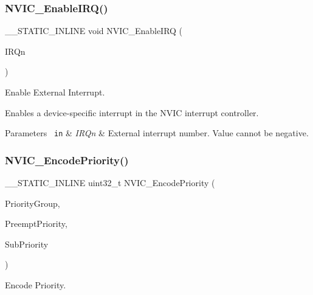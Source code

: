 \subsubsection{\texorpdfstring{NVIC\_EnableIRQ()}{NVIC\_EnableIRQ()}}
{\footnotesize\ttfamily \+\_\+\+\_\+\+S\+T\+A\+T\+I\+C\+\_\+\+I\+N\+L\+I\+NE void N\+V\+I\+C\+\_\+\+Enable\+I\+RQ (\begin{DoxyParamCaption}\item[{\mbox{\hyperlink{group__SAME70J19__cmsis_gac3af4a32370fb28c4ade8bf2add80251}{I\+R\+Qn\+\_\+\+Type}}}]{I\+R\+Qn }\end{DoxyParamCaption})}



Enable External Interrupt. 

Enables a device-\/specific interrupt in the N\+V\+IC interrupt controller. 
\begin{DoxyParams}[1]{Parameters}
\mbox{\texttt{ in}}  & {\em I\+R\+Qn} & External interrupt number. Value cannot be negative. \\
\hline
\end{DoxyParams}
\mbox{\label{group__CMSIS__Core__NVICFunctions_gadb94ac5d892b376e4f3555ae0418ebac}} 
\subsubsection{\texorpdfstring{NVIC\_EncodePriority()}{NVIC\_EncodePriority()}}
{\footnotesize\ttfamily \+\_\+\+\_\+\+S\+T\+A\+T\+I\+C\+\_\+\+I\+N\+L\+I\+NE uint32\+\_\+t N\+V\+I\+C\+\_\+\+Encode\+Priority (\begin{DoxyParamCaption}\item[{uint32\+\_\+t}]{Priority\+Group,  }\item[{uint32\+\_\+t}]{Preempt\+Priority,  }\item[{uint32\+\_\+t}]{Sub\+Priority }\end{DoxyParamCaption})}



Encode Priority. 

